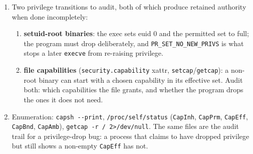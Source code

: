 \documentclass[12pt]{Training}
\begin{document}
\begin{enumerate}
    \item Two privilege transitions to audit, both of which produce retained authority when done incompletely:
    \begin{enumerate}
        \item \textbf{setuid-root binaries}: the exec sets euid 0 and the permitted set to full; the program must drop deliberately, and \lstinline{PR_SET_NO_NEW_PRIVS} is what stops a later \lstinline{execve} from re-raising privilege.
        \item \textbf{file capabilities} (\lstinline{security.capability} xattr, \lstinline{setcap}/\lstinline{getcap}): a non-root binary can start with a chosen capability in its effective set. Audit both: which capabilities the file grants, and whether the program drops the ones it does not need.
    \end{enumerate}
    \item Enumeration: \lstinline{capsh --print}, \lstinline{/proc/self/status} (\lstinline{CapInh}, \lstinline{CapPrm}, \lstinline{CapEff}, \lstinline{CapBnd}, \lstinline{CapAmb}), \lstinline{getcap -r / 2>/dev/null}. The same files are the audit trail for a privilege-drop bug: a process that claims to have dropped privilege but still shows a non-empty \lstinline{CapEff} has not.
\end{enumerate}
\end{document}
